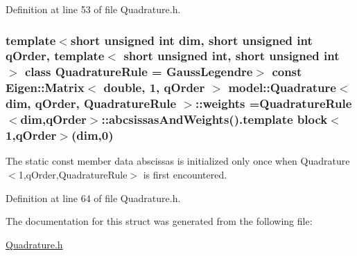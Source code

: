 Definition at line 53 of file Quadrature.\+h.

\hypertarget{structmodel_1_1_quadrature_aad89450c9a6dd8f1f39eb219d13b2cd6}{}
\subsubsection[{weights}]{\setlength{\rightskip}{0pt plus 5cm}template$<$short unsigned int dim, short unsigned int q\+Order, template$<$ short unsigned int, short unsigned int $>$ class Quadrature\+Rule = Gauss\+Legendre$>$ const Eigen\+::\+Matrix$<$ double, 1, q\+Order $>$ {\bf model\+::\+Quadrature}$<$ {\bf dim}, q\+Order, Quadrature\+Rule $>$\+::weights =Quadrature\+Rule$<${\bf dim},q\+Order$>$\+::abcsissas\+And\+Weights().template block$<$1,q\+Order$>$({\bf dim},0)\hspace{0.3cm}{\ttfamily [static]}}\label{structmodel_1_1_quadrature_aad89450c9a6dd8f1f39eb219d13b2cd6}


The static const member data abscissas is initialized only once when Quadrature$<$1,q\+Order,\+Quadrature\+Rule$>$ is first encountered. 



Definition at line 64 of file Quadrature.\+h.



The documentation for this struct was generated from the following file\+:\begin{DoxyCompactItemize}
\item 
\hyperlink{_quadrature_8h}{Quadrature.\+h}\end{DoxyCompactItemize}
